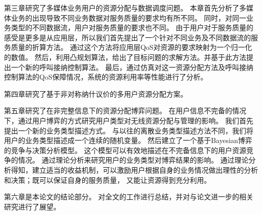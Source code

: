 第三章研究了多媒体业务用户的资源分配与数据调度问题。
本章首先分析了多媒体业务的出现导致不同业务数据对服务质量的要求均有所不同。
同时，对同一业务类型的不同数据流，用户对服务质量的要求也不同。
由于用户对于服务质量的感受是更多是从应用层，所以我们首先提出了一个针对不同业务及不同数据流的服务质量的折算方法。
通过这个方法将应用层QoS对资源的要求映射为一个归一化的数值。
然后，利用凸规划算法，给出了目标问题的求解方法。并基于此方法提出一个新的呼叫接纳控制算法。
最后，通过仿真对这一资源分配方法及呼叫接纳控制算法的QoS保障情况，系统的资源利用率等性能进行了分析。


第四章研究了基于非对称纳什议价的多用户资源分配方案。

第五章研究了在非完整信息下的资源分配博弈问题。
在用户信息不完备的情况下，通过用户博弈的方式研究用户类型对无线资源分配与管理的影响。
我们首先提出一个新的业务类型描述方式。
与以往的离散业务类型描述方法不同，我们将用户的业务类型描述成一个连续的随机变量。
然后建立了一个基于Bayesian博弈的竞争与决策分析模型。
这个模型可以有效地描述在不完备信息下的用户资源竞争的情况。
通过理论分析来研究用户的业务类型对博弈结果的影响。
通过理论分析得知，建立适当的收益机制，可以激励用户根据自身的业务情况做出理性的分析和决策；既可以保证自身的服务质量，
又能让资源得到充分利用。

\par 第六章是本论文的结论部分。
对全文的工作进行总结，并对与论文进一步的相关研究进行了展望。
